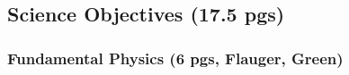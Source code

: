 \documentclass[12pt]{article}
\begin{document}



\vspace{-0.18in}

\subsection{Science Objectives (17.5 pgs) } 

\vspace{-0.05in}

    

\subsubsection{Fundamental Physics (6 pgs, Flauger, Green)}
\end{document}
